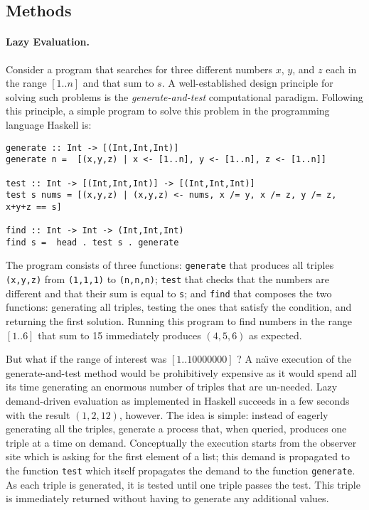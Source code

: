\documentclass{article}
\begin{document}
\begin{refsection}
\section{Methods}

\paragraph*{Lazy Evaluation.}
Consider a program that searches for three different numbers $x$, $y$,
and $z$ each in the range $[1..n]$ and that sum to $s$. A
well-established design principle for solving such problems is the
\emph{generate-and-test} computational paradigm. Following this
principle, a simple program to solve this problem in the programming
language Haskell is:

\begin{verbatim}
generate :: Int -> [(Int,Int,Int)]
generate n =  [(x,y,z) | x <- [1..n], y <- [1..n], z <- [1..n]]

test :: Int -> [(Int,Int,Int)] -> [(Int,Int,Int)]
test s nums = [(x,y,z) | (x,y,z) <- nums, x /= y, x /= z, y /= z, x+y+z == s]

find :: Int -> Int -> (Int,Int,Int)
find s =  head . test s . generate
\end{verbatim}

The program consists of three functions: \verb|generate| that produces
all triples \verb|(x,y,z)| from \verb|(1,1,1)| to \verb|(n,n,n)|;
\verb|test| that checks that the numbers are different and that their
sum is equal to \verb|s|; and \verb|find| that composes the two
functions: generating all triples, testing the ones that satisfy the
condition, and returning the first solution. Running this program to
find numbers in the range $[1..6]$ that sum to 15 immediately produces
$(4,5,6)$ as expected.

But what if the range of interest was $[1..10000000]$ ? A na\"\i ve
execution of the generate-and-test method would be prohibitively
expensive as it would spend all its time generating an enormous number
of triples that are un-needed. Lazy demand-driven evaluation as
implemented in Haskell succeeds in a few seconds with the result
$(1,2,12)$, however. The idea is simple: instead of eagerly generating
all the triples, generate a process that, when queried, produces one
triple at a time on demand. Conceptually the execution starts from the
observer site which is asking for the first element of a list; this
demand is propagated to the function \verb|test| which itself
propagates the demand to the function \verb|generate|. As each triple
is generated, it is tested until one triple passes the test. This
triple is immediately returned without having to generate any
additional values.


\end{refsection}
\end{document}
